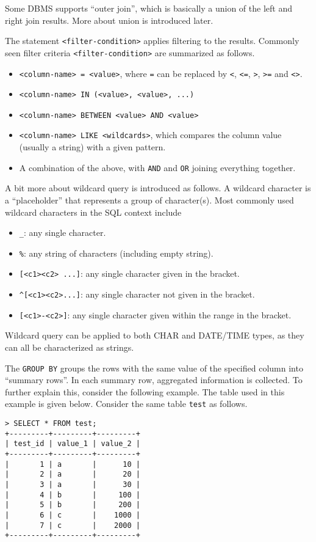 Some DBMS supports ``outer join'', which is basically a union of the left and right join results. More about union is introduced later.

The statement \verb|<filter-condition>| applies filtering to the results. Commonly seen filter criteria \verb|<filter-condition>| are summarized as follows.
\begin{itemize}
  \item \verb|<column-name> = <value>|, where \verb|=| can be replaced by \verb|<|, \verb|<=|, \verb|>|, \verb|>=| and \verb|<>|.
  \item \verb|<column-name> IN (<value>, <value>, ...)|
  \item \verb|<column-name> BETWEEN <value> AND <value>|
  \item \verb|<column-name> LIKE <wildcards>|, which compares the column value (usually a string) with a given pattern.
  \item A combination of the above, with \verb|AND| and \verb|OR| joining everything together.
\end{itemize}

A bit more about wildcard query is introduced as follows. A wildcard character is a ``placeholder'' that represents a group of character(s). Most commonly used wildcard characters in the SQL context include
\begin{itemize}
  \item \verb|_|: any single character.
  \item \verb|%|: any string of characters (including empty string).
  \item \verb|[<c1><c2> ...]|: any single character given in the bracket.
  \item \verb|^[<c1><c2>...]|: any single character not given in the bracket.
  \item \verb|[<c1>-<c2>]|: any single character given within the range in the bracket.
\end{itemize}
Wildcard query can be applied to both CHAR and DATE/TIME types, as they can all be characterized as strings.

The \verb|GROUP BY| groups the rows with the same value of the specified column into ``summary rows''. In each summary row, aggregated information is collected. To further explain this, consider the following example. The table used in this example is given below. Consider the same table \verb|test| as follows.
\begin{lstlisting}
> SELECT * FROM test;
+---------+---------+---------+
| test_id | value_1 | value_2 |
+---------+---------+---------+
|       1 | a       |      10 |
|       2 | a       |      20 |
|       3 | a       |      30 |
|       4 | b       |     100 |
|       5 | b       |     200 |
|       6 | c       |    1000 |
|       7 | c       |    2000 |
+---------+---------+---------+
\end{lstlisting}

